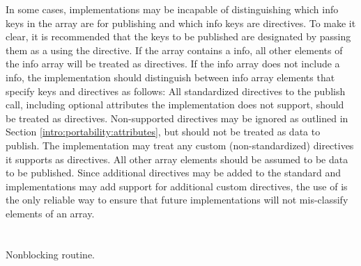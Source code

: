 In some cases, implementations may be incapable of distinguishing which
info keys in the  array are for publishing and which info keys are
directives.  To make it clear, it is recommended that the keys to be published
are designated by passing them as a  using the
 directive.
If the  array contains a  info,
all other elements of the info array will be treated as directives.
If the info array does not include a  info,
the implementation should
distinguish between info array elements that specify keys and directives as follows:
All standardized directives to the publish call,
including optional attributes the implementation does not support,
should be treated as
directives.  Non-supported directives
may be ignored as outlined in Section \ref{intro:portability:attributes},
but should not be treated as data to
publish.  The implementation may treat any custom (non-standardized) directives it
supports as directives.  All other  array elements
should be assumed to be data to be published.
Since additional directives may be added to the standard and implementations may add support for additional custom directives, the use of  is the only reliable way to ensure that
future implementations will not mis-classify elements of an  array.

\section{}

\summary

Nonblocking  routine.

\format


\begin{arglist}
\end{arglist}

